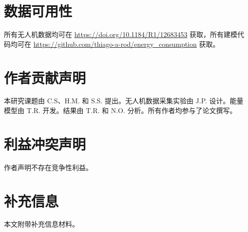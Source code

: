 \documentclass{article}
\begin{document}
\section*{数据可用性}
所有无人机数据均可在 \href{https://doi.org/10.1184/R1/12683453}{https://doi.org/10.1184/R1/12683453} 获取，所有建模代码均可在 \href{https://github.com/thiago-a-rod/energy\_consumption}{https://github.com/thiago-a-rod/energy\_consumption} 获取。 

\section*{作者贡献声明}
本研究课题由 C.S、H.M. 和 S.S. 提出。无人机数据采集实验由 J.P. 设计。能量模型由 T.R. 开发。结果由 T.R. 和 N.O. 分析。所有作者均参与了论文撰写。 

\section*{利益冲突声明}
作者声明不存在竞争性利益。

\section*{补充信息}
本文附带补充信息材料。

%
%
\printbibliography
\end{document}
